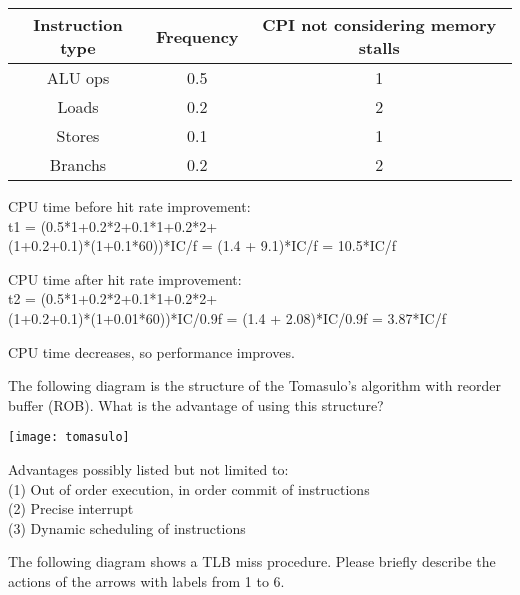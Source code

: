 \documentclass[a4paper, 12pt, addpoints]{exam}
\begin{document}
\begin{questions}
\begin{center}
  \begin{tabular}{ | c | c | c | }
    \hline
    Instruction type & Frequency & CPI not considering memory stalls \\ \hline
    ALU ops & 0.5 & 1 \\ \hline
    Loads & 0.2 & 2 \\ \hline
    Stores & 0.1 & 1 \\ \hline
    Branchs & 0.2 & 2 \\
    \hline
  \end{tabular}
\end{center}


\begin{solution} 
\newpage

CPU time before hit rate improvement:  \\
\centering t1 = (0.5*1+0.2*2+0.1*1+0.2*2+ \\ (1+0.2+0.1)*(1+0.1*60))*IC/f = (1.4 + 9.1)*IC/f = 10.5*IC/f   \\
\raggedright CPU time after hit rate improvement:  \\
\centering t2 = (0.5*1+0.2*2+0.1*1+0.2*2+ \\ (1+0.2+0.1)*(1+0.01*60))*IC/0.9f = (1.4 + 2.08)*IC/0.9f = 3.87*IC/f  \\
\raggedright CPU time decreases, so performance improves.
\end{solution} 
\newpage


\raggedright

\question[10]
The following diagram is the structure of the Tomasulo's algorithm with reorder buffer (ROB). What is the advantage of using this structure?

\centering \texttt{[image: tomasulo]}

\begin{solution} 
\newpage

Advantages possibly listed but not limited to:  \\
(1) Out of order execution, in order commit of instructions   \\
(2) Precise interrupt \\
(3) Dynamic scheduling of instructions \\
\end{solution} 
\newpage


\raggedright

\question[10]
The following diagram shows a TLB miss procedure. Please briefly describe the actions of the arrows with labels from 1 to 6.


\end{questions}
\end{document}

